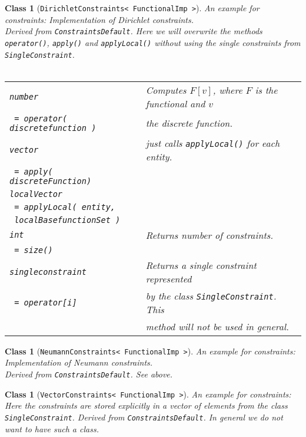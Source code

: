\documentclass[a4paper,11pt]{article}
\numberwithin{equation}{section}
\newtheorem{class}[definition]{Class}
\newcommand{\theoremEndLine}{\hspace{1mm}}
\newcommand{\CodeT}[1]{\textnormal{\texttt{#1}}}
\begin{document}
	\begin{class}[\CodeT{DirichletConstraints< FunctionalImp >}]
		An example for constraints: Implementation of Dirichlet constraints.\\
		Derived from \CodeT{ConstraintsDefault}. Here we will \emph{overwrite} the methods \CodeT{operator()}, \CodeT{apply()} and \CodeT{applyLocal()} without using the single constraints from \CodeT{SingleConstraint}.\\\\
		\begin{tabular}{|l|l|}
			\hline
			\CodeT{number} & Computes $F[v]$, where $F$ is the functional and $v$\\
			\CodeT{ = operator( discretefunction )} & the discrete function.\\
			\hline
			\CodeT{vector} & just calls \CodeT{applyLocal()} for each entity.\\
			\CodeT{ = apply( discreteFunction) } & \\
			\hline
			\CodeT{localVector} & \\
			\CodeT{ = applyLocal( entity,} & \\
			\CodeT{ localBasefunctionSet )}  & \\         
			\hline
			\CodeT{int} & Returns number of constraints. \\
			\CodeT{ = size()} & \\  
			\hline
			\CodeT{singleconstraint} & Returns a single constraint represented\\
			\CodeT{ = operator[i]} & by the class \CodeT{SingleConstraint}. This \\
				& method will not be used in general.\\
			\hline
		\end{tabular}
  \end{class}\theoremEndLine

	\begin{class}[\CodeT{NeumannConstraints< FunctionalImp >}]
		An example for constraints: Implementation of Neumann constraints.\\
		Derived from \CodeT{ConstraintsDefault}. See above.
  \end{class}\theoremEndLine

	\begin{class}[\CodeT{VectorConstraints< FunctionalImp >}]
		An example for constraints: Here the constraints are stored explicitly in a vector of elements from the class \CodeT{SingleConstraint}. Derived from \CodeT{ConstraintsDefault}. \emph{In general we do not want to have such a class}.
  \end{class}\theoremEndLine




  
  
\end{document}
